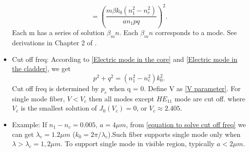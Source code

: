 \documentclass[12pt]{extarticle}
\numberwithin{equation}{section}
\numberwithin{figure}{section}
\numberwithin{table}{section}
\newcommand{\<}{\langle}
\renewcommand{\>}{\rangle}
\theoremstyle{definition}
\begin{document}
\begin{itemize}
                    \begin{equation}
                        [\frac{J_m^{'} (pa)}{pJ_m(pa)}+\frac{K_m^{'} (qa)}{qK_m(qa)}][\frac{J_m^{'} (pa)}{pJ_m(pa)}+\frac{n_c^2}{n_1^2}\frac{K_m^{'} (qa)}{qK_m(qa)}]=(\frac{m\beta k_0(n_1^2-n_c^2)}{an_1 pq})^2.
                        \label{eigen value equation of beta}
                    \end{equation}
                    Each m has a series of solution $\beta_mn$. Each $\beta_mn$ corresponds to a mode. See derivations in Chapter 2 of \cite{marcuse_theory_1991}.
                \item Cut off freq: According to \autoref{Electric mode in the core} and \autoref{Electric mode in the cladder}, we get
                    \begin{equation}
                        p^2+q^2=(n_1^2-n_c^2)k_0^2.
                        \label{equation to solve cut off freq}
                    \end{equation}
                    Cut off freq is determined by $p_c$ when q = 0. Define V as \autoref{V parameter}. For single mode fiber, $V<V_c$ then all modes except $HE_{11}$ mode are cut off. where $V_c$ is the smallest solution of $J_0(V_c)=0$, or $V_c\approx 2.405$.
                \item Example: If $n_1-n_c=0.005$, $a=4\mu m$, from \autoref{equation to solve cut off freq} we can get $\lambda_c=1.2\mu m$ ($k_0=2\pi/\lambda_c$).Such fiber supports single mode only when $\lambda>\lambda_c=1,2\mu m$. To support single mode in visible region, typically $a<2\mu m$.
             \end{itemize}
\end{document}

